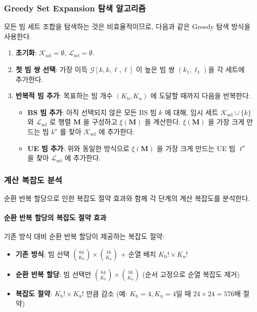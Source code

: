 \documentclass[10pt]{article}
\begin{document}
\subsubsection{Greedy Set Expansion 탐색 알고리즘}
모든 빔 세트 조합을 탐색하는 것은 비효율적이므로, 다음과 같은 Greedy 탐색 방식을 사용한다.
\begin{enumerate}
    \item \textbf{초기화}: $\mathcal{K}_{\text{sel}} = \emptyset$, $\mathcal{L}_{\text{sel}} = \emptyset$.
    \item \textbf{첫 빔 쌍 선택}: 가장 이득 $\mathcal{G}[k,k,\ell,\ell]$ 이 높은 빔 쌍 $(k_1, \ell_1)$을 각 세트에 추가한다.
    \item \textbf{반복적 빔 추가}: 목표하는 빔 개수 $(K_{\text{b}}, K_{\text{u}})$ 에 도달할 때까지 다음을 반복한다.
    \begin{itemize}
        \item \textbf{BS 빔 추가}: 아직 선택되지 않은 모든 BS 빔 $k$ 에 대해, 임시 세트 $\mathcal{K}_{\text{sel}} \cup \{k\}$ 와 $\mathcal{L}_{\text{sel}}$ 로 행렬 $\mathbf{M}$ 을 구성하고 $\xi(\mathbf{M})$ 을 계산한다. $\xi(\mathbf{M})$ 을 가장 크게 만드는 빔 $k^{\star}$ 를 찾아 $\mathcal{K}_{\text{sel}}$ 에 추가한다.
        \item \textbf{UE 빔 추가}: 위와 동일한 방식으로 $\xi(\mathbf{M})$ 을 가장 크게 만드는 UE 빔 $\ell^{\star}$ 을 찾아 $\mathcal{L}_{\text{sel}}$ 에 추가한다.
    \end{itemize}
\end{enumerate}

\subsubsection{계산 복잡도 분석}
순환 반복 할당으로 인한 복잡도 절약 효과와 함께 각 단계의 계산 복잡도를 분석한다.

\paragraph{순환 반복 할당의 복잡도 절약 효과}
기존 방식 대비 순환 반복 할당이 제공하는 복잡도 절약:
\begin{itemize}
    \item \textbf{기존 방식}: 빔 선택 $\binom{64}{K_{\text{b}}} \times \binom{16}{K_{\text{u}}}$ + 순열 배치 $K_{\text{b}}! \times K_{\text{u}}!$
    \item \textbf{순환 반복 할당}: 빔 선택만 $\binom{64}{K_{\text{b}}} \times \binom{16}{K_{\text{u}}}$ (순서 고정으로 순열 복잡도 제거)
    \item \textbf{복잡도 절약}: $K_{\text{b}}! \times K_{\text{u}}!$ 만큼 감소 (예: $K_{\text{b}}=4, K_{\text{u}}=4$일 때 $24 \times 24 = 576$배 절약)
\end{itemize}
\end{document}
